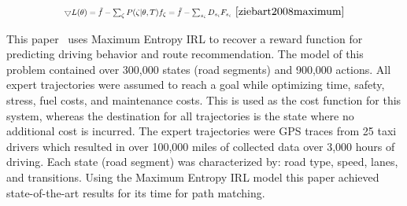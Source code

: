\documentclass[12pt,american]{report}
\begin{document}
\begin{equation}
            \label{eq:maxent_gradient}
            \resizebox{0.44\textwidth}{!}{$\bigtriangledown L(\theta) = \tilde f - \sum_{\zeta}^{} P(\zeta|\theta,T)f_\zeta = \tilde f - \sum_{s_i}^{}D_{s_{i}}F_{s_{i}}$}~\cite{ziebart2008maximum}%
        \end{equation}

This paper~\cite{ziebart2008maximum} uses Maximum Entropy IRL to recover a reward function for predicting driving behavior and route recommendation. The model of this problem contained over 300,000 states (road segments) and 900,000 actions. All expert trajectories were assumed to reach a goal while optimizing time, safety, stress, fuel costs, and maintenance costs. This is used as the cost function for this system, whereas the destination for all trajectories is the state where no additional cost is incurred. The expert trajectories were GPS traces from 25 taxi drivers which resulted in over 100,000 miles of collected data over 3,000 hours of driving. Each state (road segment) was characterized by: road type, speed, lanes, and transitions. Using the Maximum Entropy IRL model this paper achieved state-of-the-art results for its time for path matching.
\end{document}
